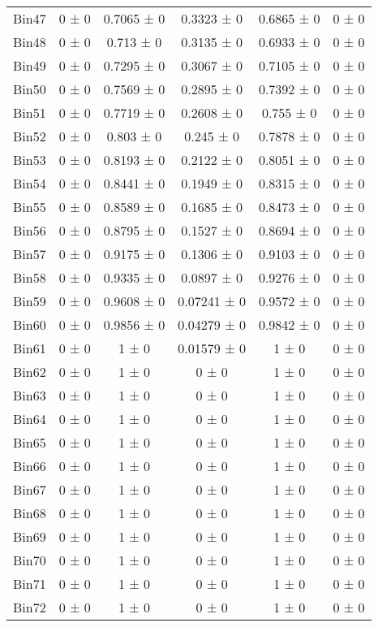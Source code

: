 \begin{tabular}{@{\extracolsep{4pt}}lccccc@{}}
     Bin47 & 0 ± 0 & 0.7065 ± 0 & 0.3323 ± 0 & 0.6865 ± 0 & 0 ± 0 \\ 
     Bin48 & 0 ± 0 & 0.713 ± 0 & 0.3135 ± 0 & 0.6933 ± 0 & 0 ± 0 \\ 
     Bin49 & 0 ± 0 & 0.7295 ± 0 & 0.3067 ± 0 & 0.7105 ± 0 & 0 ± 0 \\ 
     Bin50 & 0 ± 0 & 0.7569 ± 0 & 0.2895 ± 0 & 0.7392 ± 0 & 0 ± 0 \\ 
     Bin51 & 0 ± 0 & 0.7719 ± 0 & 0.2608 ± 0 & 0.755 ± 0 & 0 ± 0 \\ 
     Bin52 & 0 ± 0 & 0.803 ± 0 & 0.245 ± 0 & 0.7878 ± 0 & 0 ± 0 \\ 
     Bin53 & 0 ± 0 & 0.8193 ± 0 & 0.2122 ± 0 & 0.8051 ± 0 & 0 ± 0 \\ 
     Bin54 & 0 ± 0 & 0.8441 ± 0 & 0.1949 ± 0 & 0.8315 ± 0 & 0 ± 0 \\ 
     Bin55 & 0 ± 0 & 0.8589 ± 0 & 0.1685 ± 0 & 0.8473 ± 0 & 0 ± 0 \\ 
     Bin56 & 0 ± 0 & 0.8795 ± 0 & 0.1527 ± 0 & 0.8694 ± 0 & 0 ± 0 \\ 
     Bin57 & 0 ± 0 & 0.9175 ± 0 & 0.1306 ± 0 & 0.9103 ± 0 & 0 ± 0 \\ 
     Bin58 & 0 ± 0 & 0.9335 ± 0 & 0.0897 ± 0 & 0.9276 ± 0 & 0 ± 0 \\ 
     Bin59 & 0 ± 0 & 0.9608 ± 0 & 0.07241 ± 0 & 0.9572 ± 0 & 0 ± 0 \\ 
     Bin60 & 0 ± 0 & 0.9856 ± 0 & 0.04279 ± 0 & 0.9842 ± 0 & 0 ± 0 \\ 
     Bin61 & 0 ± 0 & 1 ± 0 & 0.01579 ± 0 & 1 ± 0 & 0 ± 0 \\ 
     Bin62 & 0 ± 0 & 1 ± 0 & 0 ± 0 & 1 ± 0 & 0 ± 0 \\ 
     Bin63 & 0 ± 0 & 1 ± 0 & 0 ± 0 & 1 ± 0 & 0 ± 0 \\ 
     Bin64 & 0 ± 0 & 1 ± 0 & 0 ± 0 & 1 ± 0 & 0 ± 0 \\ 
     Bin65 & 0 ± 0 & 1 ± 0 & 0 ± 0 & 1 ± 0 & 0 ± 0 \\ 
     Bin66 & 0 ± 0 & 1 ± 0 & 0 ± 0 & 1 ± 0 & 0 ± 0 \\ 
     Bin67 & 0 ± 0 & 1 ± 0 & 0 ± 0 & 1 ± 0 & 0 ± 0 \\ 
     Bin68 & 0 ± 0 & 1 ± 0 & 0 ± 0 & 1 ± 0 & 0 ± 0 \\ 
     Bin69 & 0 ± 0 & 1 ± 0 & 0 ± 0 & 1 ± 0 & 0 ± 0 \\ 
     Bin70 & 0 ± 0 & 1 ± 0 & 0 ± 0 & 1 ± 0 & 0 ± 0 \\ 
     Bin71 & 0 ± 0 & 1 ± 0 & 0 ± 0 & 1 ± 0 & 0 ± 0 \\ 
     Bin72 & 0 ± 0 & 1 ± 0 & 0 ± 0 & 1 ± 0 & 0 ± 0 \\ 

\end{tabular}
